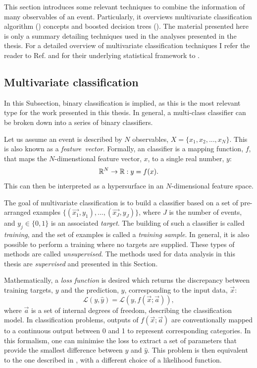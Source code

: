 This section introduces some relevant techniques to combine the information of many observables of an event. 
Particularly, it overviews multivariate classification algorithm (\MVA) concepts and boosted decision trees (). 
The material presented here is only a summary detailing techniques used in the analyses presented in the thesis.
For a detailed overview of multivariate classification techniques I refer the reader to Ref.\cite{Behnke:2013pga} and for their underlying statistical framework to \cite{Hastie_Tibshirani_Friedman_2001,bishop_2016}.

\subsection{Multivariate classification}

In this Subsection, binary classification is implied, as this is the most relevant type for the work presented in this thesis. 
In general, a multi-class \MVA classifier can be broken down into a series of binary \MVA classifiers.

Let us assume an event is described by $N$ observables, $X=\{x_1,x_2,...,x_N\}$. This is also known as a \textit{feature~vector}.
Formally, an \MVA classifier is a mapping function, $f$, that maps the $N$-dimenstional feature vector, $x$, to a single real number, $y$:
\begin{equation}
    \mathbb{R}^N \rightarrow \mathbb{R}: y = f(x).
\end{equation}
This can then be interpreted as a hypersurface in an $N$-dimensional feature space.

The goal of multivariate classification is to build a classifier based on a set of pre-arranged examples $\{(\vec{x_1},y_1),..., (\vec{x_J},y_J)\}$, where $J$ is the number of events, and $y_j\in\{0,1\}$ is an associated \textit{target}.
The building of such a classifier is called \textit{training}, and the set of examples is called a \textit{training sample}.
In general, it is also possible to perform a training where no targets are supplied. 
These types of methods are called \textit{unsupervised}.
The methods used for data analysis in this thesis are \textit{supervised} and presented in this Section.

Mathematically, a \textit{loss function} is desired which returns the discrepancy between training targets, $y$ and the prediction, $\hat{y}$, corresponding to the input data, $\vec{x}$:
\begin{equation}\label{eq:loss_function}
    \mathcal{L}(y, \hat{y}) = \mathcal{L}(y, f(\vec{x};\vec{a})),
\end{equation}
where $\vec{a}$ is a set of internal degrees of freedom, describing the classification model.
In classification problems, outputs of $f(\vec{x};\vec{a})$ are conventionally mapped to a continuous output between 0 and 1 to represent corresponding categories.
In this formalism, one can minimise the loss to extract a set of parameters that provide the smallest difference between $y$ and $\hat{y}$.
This problem is then equivalent to the one described in , with a different choice of a likelihood function.



